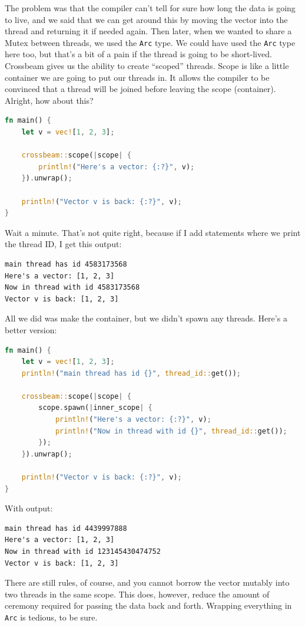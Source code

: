 \documentclass[a4paper]{report}
\begin{document}
The problem was that the compiler can't tell for sure how long the data is going to live, and we said that we can get around this by moving the vector into the thread and returning it if needed again. Then later, when we wanted to share a Mutex between threads, we used the \texttt{Arc} type. We could have used the \texttt{Arc} type here too, but that's a bit of a pain if the thread is going to be short-lived. Crossbeam gives us the ability to create ``scoped'' threads. Scope is like a little container we are going to put our threads in. It allows the compiler to be convinced that a thread will be joined before leaving the scope (container). Alright, how about this?

\begin{lstlisting}[language=Rust]
fn main() {
    let v = vec![1, 2, 3];

    crossbeam::scope(|scope| {
        println!("Here's a vector: {:?}", v);
    }).unwrap();

    println!("Vector v is back: {:?}", v);
}
\end{lstlisting}

Wait a minute. That's not quite right, because if I add statements where we print the thread ID, I get this output:

{\scriptsize 
\begin{verbatim}
main thread has id 4583173568
Here's a vector: [1, 2, 3]
Now in thread with id 4583173568
Vector v is back: [1, 2, 3]
\end{verbatim}
}

All we did was make the container, but we didn't spawn any threads. Here's a better version:
\begin{lstlisting}[language=Rust]
fn main() {
    let v = vec![1, 2, 3];
    println!("main thread has id {}", thread_id::get());

    crossbeam::scope(|scope| {
        scope.spawn(|inner_scope| {
            println!("Here's a vector: {:?}", v);
            println!("Now in thread with id {}", thread_id::get());
        });
    }).unwrap();

    println!("Vector v is back: {:?}", v);
}
\end{lstlisting}
With output:

{\scriptsize 
\begin{verbatim}
main thread has id 4439997888
Here's a vector: [1, 2, 3]
Now in thread with id 123145430474752
Vector v is back: [1, 2, 3]
\end{verbatim}
}

There are still rules, of course, and you cannot borrow the vector mutably into two threads in the same scope. This does, however, reduce the amount of ceremony required for passing the data back and forth. Wrapping everything in \texttt{Arc} is tedious, to be sure. 
\end{document}
